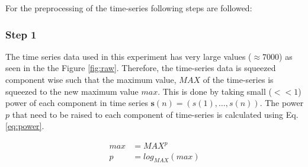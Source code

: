 For the preprocessing of the time-series following steps are followed:
\subsubsection{Step 1}
The time series data used in this experiment has very large values ($\approx  7000$) as seen in the the Figure \ref{fig:raw}.  Therefore, the time-series data is squeezed component wise such that the maximum value, $MAX$ of the time-series is squeezed to the new maximum value $max$. This is done by taking small ($< < 1$) power of each component in time series $\mathbf{s}(n) = (s(1),\hdots,s(n))$. The power $p$ that need to be raised to each component of time-series is calculated using Eq. \ref{eq:power}.  

\begin{equation}
\begin{split}
		max &= MAX^p\\
		p &= log_{MAX}(max)
\end{split}
\label{eq:power}
\end{equation}

